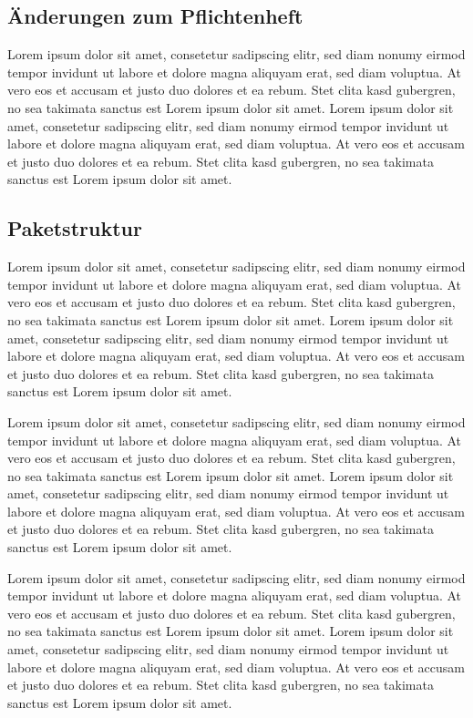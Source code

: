 


\subsection{Änderungen zum Pflichtenheft}

Lorem ipsum dolor sit amet, consetetur sadipscing elitr, sed diam nonumy eirmod tempor invidunt ut labore et dolore magna aliquyam erat, sed diam voluptua. At vero eos et accusam et justo duo dolores et ea rebum. Stet clita kasd gubergren, no sea takimata sanctus est Lorem ipsum dolor sit amet. Lorem ipsum dolor sit amet, consetetur sadipscing elitr, sed diam nonumy eirmod tempor invidunt ut labore et dolore magna aliquyam erat, sed diam voluptua. At vero eos et accusam et justo duo dolores et ea rebum. Stet clita kasd gubergren, no sea takimata sanctus est Lorem ipsum dolor sit amet.


\subsection{Paketstruktur}

Lorem ipsum dolor sit amet, consetetur sadipscing elitr, sed diam nonumy eirmod tempor invidunt ut labore et dolore magna aliquyam erat, sed diam voluptua. At vero eos et accusam et justo duo dolores et ea rebum. Stet clita kasd gubergren, no sea takimata sanctus est Lorem ipsum dolor sit amet. Lorem ipsum dolor sit amet, consetetur sadipscing elitr, sed diam nonumy eirmod tempor invidunt ut labore et dolore magna aliquyam erat, sed diam voluptua. At vero eos et accusam et justo duo dolores et ea rebum. Stet clita kasd gubergren, no sea takimata sanctus est Lorem ipsum dolor sit amet.

Lorem ipsum dolor sit amet, consetetur sadipscing elitr, sed diam nonumy eirmod tempor invidunt ut labore et dolore magna aliquyam erat, sed diam voluptua. At vero eos et accusam et justo duo dolores et ea rebum. Stet clita kasd gubergren, no sea takimata sanctus est Lorem ipsum dolor sit amet. Lorem ipsum dolor sit amet, consetetur sadipscing elitr, sed diam nonumy eirmod tempor invidunt ut labore et dolore magna aliquyam erat, sed diam voluptua. At vero eos et accusam et justo duo dolores et ea rebum. Stet clita kasd gubergren, no sea takimata sanctus est Lorem ipsum dolor sit amet.

Lorem ipsum dolor sit amet, consetetur sadipscing elitr, sed diam nonumy eirmod tempor invidunt ut labore et dolore magna aliquyam erat, sed diam voluptua. At vero eos et accusam et justo duo dolores et ea rebum. Stet clita kasd gubergren, no sea takimata sanctus est Lorem ipsum dolor sit amet. Lorem ipsum dolor sit amet, consetetur sadipscing elitr, sed diam nonumy eirmod tempor invidunt ut labore et dolore magna aliquyam erat, sed diam voluptua. At vero eos et accusam et justo duo dolores et ea rebum. Stet clita kasd gubergren, no sea takimata sanctus est Lorem ipsum dolor sit amet.


